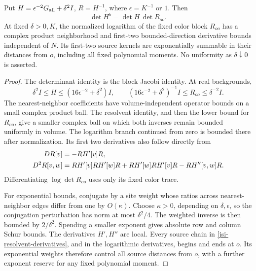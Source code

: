 \begin{lemma}
\label{jsi-base-lemma}
Put \(H=\epsilon^{-2}G_{\rm all}+\delta^2I\), \(R=H^{-1}\),
where \(\epsilon=K^{-1}\) or \(1\). Then
\begin{equation}
       \det H^b=\det H\,\det R_{oo}.
 \label{jsi-jacobi}
\end{equation}
At fixed \(\delta>0,K\), the normalized logarithm of the fixed color
block \(R_{oo}\) has a complex product neighborhood and first-two
bounded-direction derivative bounds independent of \(N\).
Its first-two source kernels are exponentially summable in their
distances from \(o\), including all fixed polynomial moments.
No uniformity as \(\delta\downarrow0\) is asserted.
\end{lemma}

\begin{proof}
The determinant identity is the block Jacobi identity. At real
backgrounds,
\[
 \delta^2I\le H\le(16\epsilon^{-2}+\delta^2)I,
 \qquad
 (16\epsilon^{-2}+\delta^2)^{-1}I
                      \le R_{oo}\le\delta^{-2}I.
\]
The nearest-neighbor coefficients have volume-independent operator
bounds on a small complex product ball. The resolvent identity,
and then the lower bound for \(R_{oo}\), give a smaller complex
ball on which both inverses remain bounded uniformly in volume.
The logarithm branch continued from zero is bounded there after
normalization. Its first two derivatives also follow directly from
\begin{align}
 DR[v]&=-RH'[v]R,\notag\\
 D^2R[v,w]&=RH'[v]RH'[w]R+RH'[w]RH'[v]R-RH''[v,w]R.
 \label{jsi-resolvent-derivatives}
\end{align}
Differentiating \(\log\det R_{oo}\) uses only its fixed color trace.

For exponential bounds, conjugate by a site weight whose ratios
across nearest-neighbor edges differ from one by \(O(\kappa)\).
Choose \(\kappa>0\), depending on \(\delta,\epsilon\), so the
conjugation perturbation has norm at most \(\delta^2/4\).
The weighted inverse is then bounded by \(2/\delta^2\).
Spending a smaller exponent gives absolute row and column Schur
bounds. The derivatives \(H',H''\) are local. Every source chain
in \eqref{jsi-resolvent-derivatives}, and in the logarithmic
derivatives, begins and ends at \(o\). Its exponential weights
therefore control all source distances from \(o\), with a further
exponent reserve for any fixed polynomial moment.
\end{proof}

